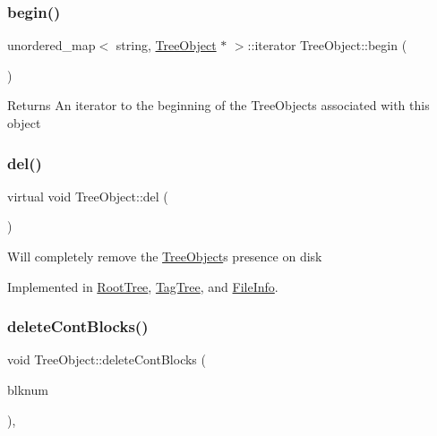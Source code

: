 \subsubsection{\texorpdfstring{begin()}{begin()}}
{\footnotesize\ttfamily unordered\+\_\+map$<$ string, \mbox{\hyperlink{classTreeObject}{Tree\+Object}} $\ast$ $>$\+::iterator Tree\+Object\+::begin (\begin{DoxyParamCaption}{ }\end{DoxyParamCaption})}

\begin{DoxyReturn}{Returns}
An iterator to the beginning of the Tree\+Objects associated with this object 
\end{DoxyReturn}
\mbox{\label{classTreeObject_af390b7479aa972888e594c07a85740b6}} 
\subsubsection{\texorpdfstring{del()}{del()}}
{\footnotesize\ttfamily virtual void Tree\+Object\+::del (\begin{DoxyParamCaption}{ }\end{DoxyParamCaption})\hspace{0.3cm}{\ttfamily [pure virtual]}}

Will completely remove the \mbox{\hyperlink{classTreeObject}{Tree\+Object}}\textquotesingle{}s presence on disk 

Implemented in \mbox{\hyperlink{classRootTree_ac431dc04b767fc66791c251d8173650d}{Root\+Tree}}, \mbox{\hyperlink{classTagTree_ad8108969f4d28b938e55c8339f19db35}{Tag\+Tree}}, and \mbox{\hyperlink{classFileInfo_a2ca34d945ed1208f227a249ba72ee427}{File\+Info}}.

\mbox{\label{classTreeObject_a74c73604c877bec03f6188147af7c509}} 
\subsubsection{\texorpdfstring{delete\+Cont\+Blocks()}{deleteContBlocks()}}
{\footnotesize\ttfamily void Tree\+Object\+::delete\+Cont\+Blocks (\begin{DoxyParamCaption}\item[{Blk\+Num\+Type}]{blknum }\end{DoxyParamCaption})\hspace{0.3cm}{\ttfamily [protected]}, {\ttfamily [virtual]}}

